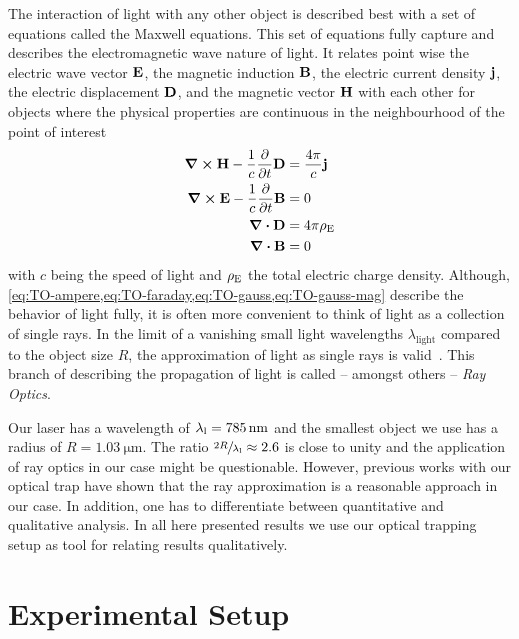 The interaction of light with any other object is described best with a set of 
equations called the Maxwell equations. This set of equations fully capture and 
describes the electromagnetic wave nature of light. It relates point wise the 
electric wave vector $\vb{E}$, the magnetic induction $\vb{B}$, the electric 
current density $\vb{j}$, the electric displacement $\vb{D}$, and the magnetic 
vector $\vb{H}$ with each other for objects where the physical properties are 
continuous in the neighbourhood of the point of interest~\cite{Born1980Ch1}
\begin{subequations}
  \begin{align}
    \curl{\vb{H}} - \frac{1}{c}\pdv{t}\vb{D} &=\frac{4\pi}{c}\vb{j} 
    \label{eq:TO-ampere} \\
    \curl{\vb{E}} - \frac{1}{c}\pdv{t}\vb{B} &=  0
    \label{eq:TO-faraday} \\
    \div{\vb{D}} &= 4\pi\rho_{\mathrm{E}}
    \label{eq:TO-gauss} \\
    \div{\vb{B}} &= 0
    \label{eq:TO-gauss-mag}
  \end{align}
\end{subequations}
with $c$ being the speed of light and $\rho_{\mathrm{E}}$ the total electric charge 
density. Although, 
\cref{eq:TO-ampere,eq:TO-faraday,eq:TO-gauss,eq:TO-gauss-mag} describe the 
behavior of light fully, it is often more convenient to think of light as a 
collection of single rays. In the limit of a vanishing small light wavelengths 
$\lambda_{\text{light}}$ compared to the object size $R$, the approximation of 
light as single rays is valid~\cite{Born1980Ch3}. This branch of describing the 
propagation of light is called -- amongst others -- \emph{Ray Optics}.

Our laser has a wavelength of $\lal=\SI{785}{\nm}$ and the smallest object we 
use has a radius of $R=\SI{1.03}{\um}$. The ratio $\sfrac{2R}{\lambda_{\mathrm{l}}}\approx 2.6$ 
is close to unity and the application of ray optics in our case might be 
questionable. However, previous works with our optical trap
\cite{Lakaemper2015,Lamprecht2016,Lamprecht2017} have shown that the ray 
approximation is a reasonable approach in our case. In addition, one has to 
differentiate between quantitative and qualitative analysis. In all here 
presented results we use our optical trapping setup as tool for relating 
results qualitatively.

\section{Experimental Setup}

